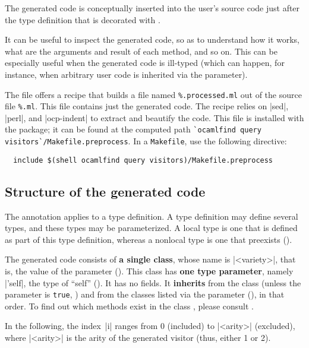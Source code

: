 \documentclass[11pt,a4paper,twoside]{article}
\renewcommand{\emph}[1]{\textbf{#1}}
\begin{document}
The generated code is conceptually inserted into the user's source code just
after the type definition that is decorated with \derivingvisitors.

It can be useful to inspect the generated code, so as to understand how it
works, what are the arguments and result of each method, and so on. This can
be especially useful when the generated code is ill-typed (which can happen,
for instance, when arbitrary user code is inherited via the \ancestors
parameter).

The file  offers a recipe that builds a file
named \verb|%.processed.ml| out of the source file \verb|%.ml|. This file contains
just the generated code. The recipe relies on \oc|sed|, \oc|perl|, and
\oc|ocp-indent| to extract and beautify the code. This file is installed
with the \visitors package; it can be found at the computed path
\verb+`ocamlfind query visitors`/Makefile.preprocess+. In a \texttt{Makefile},
use the following directive:
\begin{verbatim}
  include $(shell ocamlfind query visitors)/Makefile.preprocess
\end{verbatim}


\subsection{Structure of the generated code}
\label{sec:structure}

The \derivingvisitors annotation applies to a type definition. A type
definition may define several types, and these types may be parameterized. A
local type is one that is defined as part of this type definition, whereas a
nonlocal type is one that preexists ().

The generated code consists of \emph{a single class}, whose name is \oc|<variety>|,
that is, the value of the \variety parameter (). This class
has \emph{one type parameter}, namely \oc|'self|, the type of ``self''
(). It has no fields. It \emph{inherits} from the class
 (unless the parameter \nude is \texttt{true}, )
and from the classes listed via the \ancestors parameter (),
in that order. To find out which methods exist in the class
, please consult .

In the following, the index~\oc|i| ranges from 0 (included) to \oc|<arity>|
(excluded), where \oc|<arity>| is the arity of the generated visitor (thus,
either 1 or 2).
\end{document}
